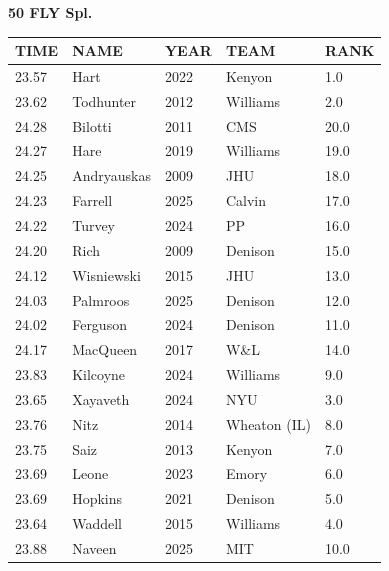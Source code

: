 \begin{table}[H]
\centering
\begin{minipage}[t]{0.6\textwidth}
\centering
\textbf{50 FLY Spl.}\\[0.1cm]
\begin{tabular}{@{}p{1.8cm}p{2.8cm}p{1.2cm}p{1.4cm}p{0.8cm}@{}}
\hline
    \textbf{TIME} & \textbf{NAME} & \textbf{YEAR} & \textbf{TEAM} & \textbf{RANK} \\
\hline
    23.57 & Hart & 2022 & Kenyon & 1.0 \\
    23.62 & Todhunter & 2012 & Williams & 2.0 \\
    24.28 & Bilotti & 2011 & CMS & 20.0 \\
    24.27 & Hare & 2019 & Williams & 19.0 \\
    24.25 & Andryauskas & 2009 & JHU & 18.0 \\
    24.23 & Farrell & 2025 & Calvin & 17.0 \\
    24.22 & Turvey & 2024 & PP & 16.0 \\
    24.20 & Rich & 2009 & Denison & 15.0 \\
    24.12 & Wisniewski & 2015 & JHU & 13.0 \\
    24.03 & Palmroos & 2025 & Denison & 12.0 \\
    24.02 & Ferguson & 2024 & Denison & 11.0 \\
    24.17 & MacQueen & 2017 & W\&L & 14.0 \\
    23.83 & Kilcoyne & 2024 & Williams & 9.0 \\
    23.65 & Xayaveth & 2024 & NYU & 3.0 \\
    23.76 & Nitz & 2014 & Wheaton (IL) & 8.0 \\
    23.75 & Saiz & 2013 & Kenyon & 7.0 \\
    23.69 & Leone & 2023 & Emory & 6.0 \\
    23.69 & Hopkins & 2021 & Denison & 5.0 \\
    23.64 & Waddell & 2015 & Williams & 4.0 \\
    23.88 & Naveen & 2025 & MIT & 10.0 \\
\hline
\end{tabular}
\end{minipage}
\end{table}

